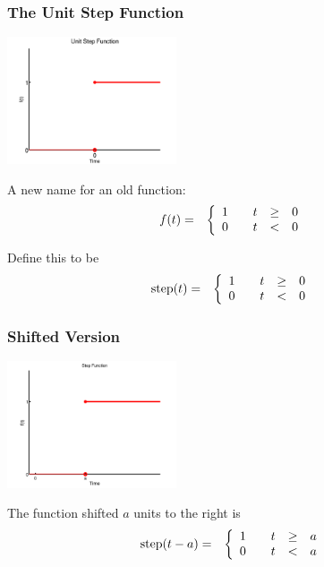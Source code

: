 \begin{frame}
  \frametitle{The Unit Step Function}

  \centerline{\includegraphics[width=5cm]{img/unitStepFunction}}

  A new name for an old function:
  \begin{eqnarray*}
    f(t) & = & 
    \left\{
      \begin{array}{r@{\hspace{2em}}rcl}
        1 & t & \geq & 0 \\
        0 & t & < & 0
      \end{array}
    \right.
  \end{eqnarray*}

  {
    Define this to be
    \begin{eqnarray*}
      \mathrm{step}(t) & = & 
      \left\{
        \begin{array}{r@{\hspace{2em}}rcl}
          1 & t & \geq & 0 \\
          0 & t & < & 0
        \end{array}
      \right.
    \end{eqnarray*}
  }

\end{frame}


\begin{frame}
  \frametitle{Shifted Version}

  \centerline{\includegraphics[width=5cm]{img/unitStepAta}}

    The function shifted $a$ units to the right is
    \begin{eqnarray*}
      \mathrm{step}(t-a) & = & 
      \left\{
        \begin{array}{r@{\hspace{2em}}rcl}
          1 & t & \geq & a \\
          0 & t & < & a
        \end{array}
      \right.
    \end{eqnarray*}


\end{frame}

